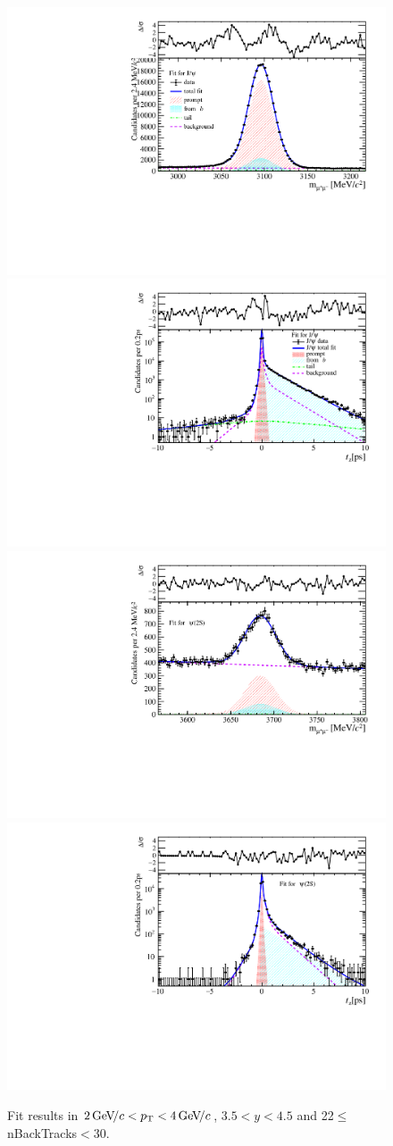 \begin{figure}[H]
\begin{center}
\includegraphics[width=0.47\linewidth]{pdf/Jpsi/drawmassB/n4y3pt2.pdf}
\includegraphics[width=0.47\linewidth]{pdf/Jpsi/2DFitB/n4y3pt2.pdf}
\vspace*{-0.5cm}
\includegraphics[width=0.47\linewidth]{pdf/Psi2S/drawmassB/n4y3pt2.pdf}
\includegraphics[width=0.47\linewidth]{pdf/Psi2S/2DFitB/n4y3pt2.pdf}
\vspace*{-0.5cm}
\end{center}
\caption{Fit results in $2\text{\,Ge\kern -0.1em V\!/}c<p_{\mathrm{T}}<4\text{\,Ge\kern -0.1em V\!/}c$, $3.5<y<4.5$ and 22$\leq$nBackTracks$<$30.}
\label{Fitn4y3pt2}
\end{figure}
